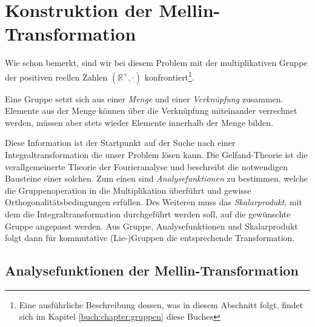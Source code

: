 %
%
%

\section{Konstruktion der Mellin-Transformation
\label{mellin:section:teil2}}
Wie schon bemerkt, sind wir bei diesem Problem mit der multiplikativen 
Gruppe der positiven reellen Zahlen $(\mathbb{R^+},\cdot)$ konfrontiert\footnote
{Eine ausführliche Beschreibung dessen, was in diesem Abschnitt 
folgt, findet sich im Kapitel \ref{buch:chapter:gruppen} diese Buches}.
\begin{definition}
    Eine Gruppe setzt sich aus einer {\em Menge} und einer 
    {\em Verknüpfung} zusammen. 
    Elemente aus der Menge können über die Verknüpfung miteinander 
    verrechnet werden, müssen aber stets wieder Elemente innerhalb der Menge bilden.
\end{definition}
Diese Information ist der Startpunkt auf der Suche nach einer 
Integraltransformation die unser Problem lösen kann.
Die Gelfand-Theorie ist die verallgemeinerte Theorie der Fourieranalyse und 
beschreibt die notwendigen Bausteine einer solchen.
Zum einen sind {\em Analysefunktionen} zu bestimmen, welche die 
Gruppenoperation in die Multiplikation überführt und gewisse 
Orthogonalitätsbedingungen erfüllen. 
Des Weiteren muss das {\em Skalarprodukt}, mit dem die Integraltransformation 
durchgeführt werden soll, auf die gewünschte Gruppe angepasst werden.
Aus Gruppe, Analysefunktionen und Skalarprodukt folgt dann
für kommutative (Lie-)Gruppen die entsprechende Transformation.





\subsection{Analysefunktionen der Mellin-Transformation
\label{mellin:subsection:analysefunktionen}}

